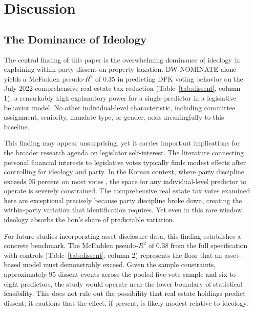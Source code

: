 \documentclass[11pt]{article}
\begin{document}
\section{Discussion}
\label{sec:discussion}

\subsection{The Dominance of Ideology}

The central finding of this paper is the overwhelming dominance of ideology in explaining within-party dissent on property taxation. DW-NOMINATE alone yields a McFadden pseudo-$R^2$ of 0.35 in predicting DPK voting behavior on the July 2022 comprehensive real estate tax reduction (Table~\ref{tab:dissent}, column 1), a remarkably high explanatory power for a single predictor in a legislative behavior model. No other individual-level characteristic, including committee assignment, seniority, mandate type, or gender, adds meaningfully to this baseline.

This finding may appear unsurprising, yet it carries important implications for the broader research agenda on legislator self-interest. The literature connecting personal financial interests to legislative votes \citep{rosenson2003, tahoun2014} typically finds modest effects after controlling for ideology and party. In the Korean context, where party discipline exceeds 95 percent on most votes \citep{shinLee2015}, the space for any individual-level predictor to operate is severely constrained. The comprehensive real estate tax votes examined here are exceptional precisely because party discipline broke down, creating the within-party variation that identification requires. Yet even in this rare window, ideology absorbs the lion's share of predictable variation.

For future studies incorporating asset disclosure data, this finding establishes a concrete benchmark. The McFadden pseudo-$R^2$ of 0.38 from the full specification with controls (Table~\ref{tab:dissent}, column 2) represents the floor that an asset-based model must demonstrably exceed. Given the sample constraints, approximately 95 dissent events across the pooled five-vote sample and six to eight predictors, the study would operate near the lower boundary of statistical feasibility. This does not rule out the possibility that real estate holdings predict dissent; it cautions that the effect, if present, is likely modest relative to ideology.
\end{document}

